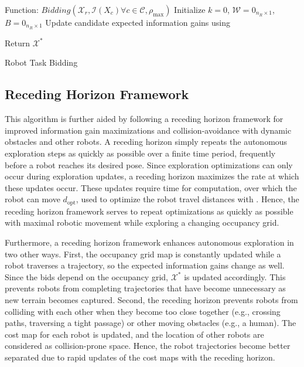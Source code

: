\begin{algorithm}
	Function: $Bidding(\mathcal X_r,\mathcal I(X_c)\forall c\in\mathcal C,\rho_\text{max})$\;
	Initialize $k=0$, $\mathcal W=0_{n_R\times1}$, $B=0_{n_R\times1}$\;
	Update candidate expected information gains using \;

	Return $\mathcal X^*$\;
\caption{Robot Task Bidding}
\label{alg:bidding}
\end{algorithm}


\subsection{Receding Horizon Framework}

This algorithm is further aided by following a receding horizon framework for improved information gain maximizations and collision-avoidance with dynamic obstacles and other robots. A receding horizon simply repeats the autonomous exploration steps as quickly as possible over a finite time period, frequently before a robot reaches its desired pose. Since exploration optimizations can only occur during exploration updates, a receding horizon maximizes the rate at which these updates occur. These updates require time for computation, over which the robot can move $d_\text{opt}$, used to optimize the robot travel distances with . Hence, the receding horizon framework serves to repeat optimizations as quickly as possible with maximal robotic movement while exploring a changing occupancy grid.

Furthermore, a receding horizon framework enhances autonomous exploration in two other ways. First, the occupancy grid map is constantly updated while a robot traverses a trajectory, so the expected information gains change as well. Since the bids depend on the occupancy grid, $\mathcal X^*$ is updated accordingly. This prevents robots from completing trajectories that have become unnecessary as new terrain becomes captured. Second, the receding horizon prevents robots from colliding with each other when they become too close together (e.g., crossing paths, traversing a tight passage) or other moving obstacles (e.g., a human). The cost map for each robot is updated, and the location of other robots are considered as collision-prone space. Hence, the robot trajectories become better separated due to rapid updates of the cost maps with the receding horizon. 

